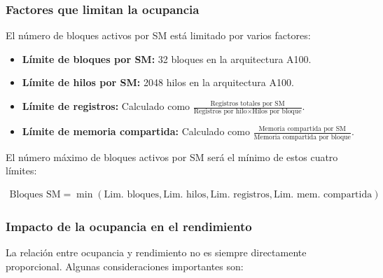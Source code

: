         \subsubsection{Factores que limitan la ocupancia}

            El número de bloques activos por SM está limitado por varios factores:
            
            \begin{itemize}
                
                \item \textbf{Límite de bloques por SM:} 32 bloques en la arquitectura A100.
               
                \item \textbf{Límite de hilos por SM:} 2048 hilos en la arquitectura A100.
                
                \item \textbf{Límite de registros:} Calculado como $\frac{\text{Registros totales por SM}}{\text{Registros por hilo} \times \text{Hilos por bloque}}$.
                
                \item \textbf{Límite de memoria compartida:} Calculado como $\frac{\text{Memoria compartida por SM}}{\text{Memoria compartida por bloque}}$.
            
            \end{itemize}
            
            El número máximo de bloques activos por SM será el mínimo de estos cuatro límites:

            \begin{align*}
                \text{Bloques SM} = \min(\text{Lim. bloques}, \text{Lim. hilos}, \text{Lim. registros}, \text{Lim. mem. compartida})
            \end{align*}
            
        \subsubsection{Impacto de la ocupancia en el rendimiento}
            
            La relación entre ocupancia y rendimiento no es siempre directamente proporcional. Algunas consideraciones importantes son:
        
